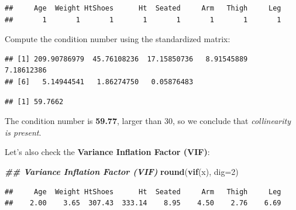 \documentclass[
]{book}
\newenvironment{Shaded}{\begin{snugshade}}{\end{snugshade}}
\newcommand{\AttributeTok}[1]{\textcolor[rgb]{0.13,0.29,0.53}{#1}}
\newcommand{\DecValTok}[1]{\textcolor[rgb]{0.00,0.00,0.81}{#1}}
\newcommand{\DocumentationTok}[1]{\textcolor[rgb]{0.56,0.35,0.01}{\textbf{\textit{#1}}}}
\newcommand{\FunctionTok}[1]{\textcolor[rgb]{0.13,0.29,0.53}{\textbf{#1}}}
\newcommand{\NormalTok}[1]{#1}
\newcommand{\OtherTok}[1]{\textcolor[rgb]{0.56,0.35,0.01}{#1}}
\newcommand{\SpecialCharTok}[1]{\textcolor[rgb]{0.81,0.36,0.00}{\textbf{#1}}}
\begin{document}
\begin{verbatim}
##     Age  Weight HtShoes      Ht  Seated     Arm   Thigh     Leg 
##       1       1       1       1       1       1       1       1
\end{verbatim}

Compute the condition number using the standardized matrix:

\begin{Shaded}
\end{Shaded}

\begin{verbatim}
## [1] 209.90786979  45.76108236  17.15850736   8.91545889   7.18612386
## [6]   5.14944541   1.86274750   0.05876483
\end{verbatim}

\begin{Shaded}
\end{Shaded}

\begin{verbatim}
## [1] 59.7662
\end{verbatim}

The condition number is \textbf{59.77}, larger than 30, so we conclude that \emph{collinearity is present}.

Let's also check the \textbf{Variance Inflation Factor (VIF)}:

\begin{Shaded}
\begin{Highlighting}[]
\DocumentationTok{\#\# Variance Inflation Factor (VIF)}
\FunctionTok{round}\NormalTok{(}\FunctionTok{vif}\NormalTok{(x), }\AttributeTok{dig=}\DecValTok{2}\NormalTok{)}
\end{Highlighting}
\end{Shaded}

\begin{verbatim}
##     Age  Weight HtShoes      Ht  Seated     Arm   Thigh     Leg 
##    2.00    3.65  307.43  333.14    8.95    4.50    2.76    6.69
\end{verbatim}
\end{document}
